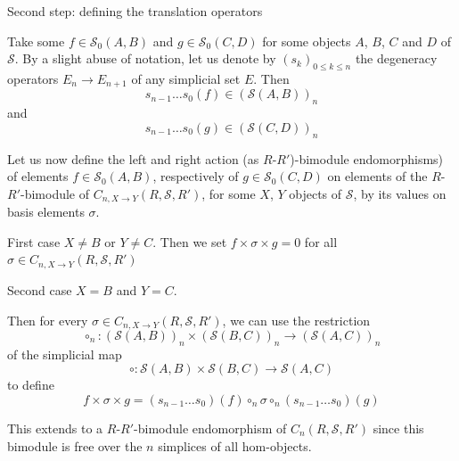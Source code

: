 \documentclass[a4paper,fleqn]{cas-sc}
\newcommand{\cS}{{\mathcal{S}}}
\begin{document}
\begin{paragraph}{Second step: defining the translation operators}

Take some $f \in \cS_0(A,B)$ and $g \in \cS_0(C,D)$ for some objects $A$, $B$, $C$ and $D$ of $\cS$. By a slight abuse of notation, let us denote by $(s_k)_{0 \leq k \leq n}$ the degeneracy operators $E_n \to E_{n+1}$ of any simplicial set $E$. Then 
\[s_{n-1}  \dots  s_0 (f) 
\in \left( \cS(A,B) \right)_n\]
and 
\[s_{n-1}  \dots  s_0 (g) 
\in \left( \cS(C,D) \right)_n\] 

Let us now define the left and right action (as $R$-$R'$)-bimodule endomorphisms) of elements $f \in \cS_0(A,B)$, respectively of $g \in \cS_0(C,D)$ on elements of the  $R$-$R'$-bimodule of $C_{n,X\rightarrow Y} \left( R, \cS, R'\right)$, for some $X$, $Y$ objects of $\cS$, by its values on basis elements $\sigma$. %

\begin{subparagraph}{First case}
$X \neq B$ or $Y \neq C$. Then we set $f \times \sigma \times g = 0$ for all $\sigma \in C_{n, X \to Y} \left( R, \cS, R'\right)$
\end{subparagraph}

\begin{subparagraph}{Second case}
$X = B$ and $Y = C$. 
 
Then for every $\sigma \in C_{n, X \to Y} \left( R, \cS, R'\right)$, we can use the restriction
\[\circ_n: (\cS(A,B))_n \times (\cS(B,C))_n \to (\cS(A,C))_n\]
of the simplicial map 
    \[\circ : \cS(A,B) \times \cS(B,C) \to \cS(A,C)\]
\noindent to define
\[f \times \sigma \times g = 
(s_{n-1} \dots  s_0) (f) \circ_n
\sigma \circ_n
(s_{n-1}  \dots  s_0) (g) 
\]
\end{subparagraph}

This extends to a $R$-$R'$-bimodule endomorphism of $C_n \left( R, \cS, R'\right)$
since this bimodule is free over the $n$ simplices of all hom-objects. 

\end{paragraph}
\end{document}
